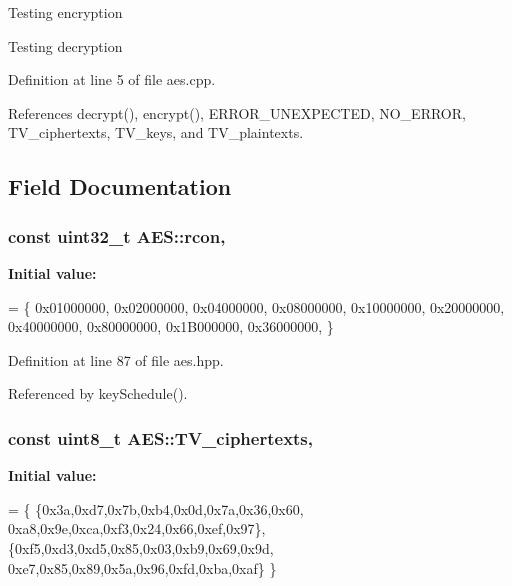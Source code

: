  Testing encryption

Testing decryption 

Definition at line 5 of file aes.\+cpp.



References decrypt(), encrypt(), E\+R\+R\+O\+R\+\_\+\+U\+N\+E\+X\+P\+E\+C\+T\+E\+D, N\+O\+\_\+\+E\+R\+R\+O\+R, T\+V\+\_\+ciphertexts, T\+V\+\_\+keys, and T\+V\+\_\+plaintexts.



\subsection{Field Documentation}
\hypertarget{classAES_a5f6082649a62bd52938c6b3b4c5a526f}{}
\subsubsection[{rcon}]{\setlength{\rightskip}{0pt plus 5cm}const uint32\+\_\+t A\+E\+S\+::rcon\hspace{0.3cm}{\ttfamily [static]}, {\ttfamily [private]}}\label{classAES_a5f6082649a62bd52938c6b3b4c5a526f}
{\bfseries Initial value\+:}
\begin{DoxyCode}
= \{
    0x01000000, 0x02000000, 0x04000000, 0x08000000,
    0x10000000, 0x20000000, 0x40000000, 0x80000000,
    0x1B000000, 0x36000000, 
\}
\end{DoxyCode}


Definition at line 87 of file aes.\+hpp.



Referenced by key\+Schedule().

\hypertarget{classAES_aaa75b4b36597677f162e2752d6c2b407}{}
\subsubsection[{T\+V\+\_\+ciphertexts}]{\setlength{\rightskip}{0pt plus 5cm}const uint8\+\_\+t A\+E\+S\+::\+T\+V\+\_\+ciphertexts\hspace{0.3cm}{\ttfamily [static]}, {\ttfamily [private]}}\label{classAES_aaa75b4b36597677f162e2752d6c2b407}
{\bfseries Initial value\+:}
\begin{DoxyCode}
= \{
  \{0x3a,0xd7,0x7b,0xb4,0x0d,0x7a,0x36,0x60,
   0xa8,0x9e,0xca,0xf3,0x24,0x66,0xef,0x97\},
  \{0xf5,0xd3,0xd5,0x85,0x03,0xb9,0x69,0x9d,
   0xe7,0x85,0x89,0x5a,0x96,0xfd,0xba,0xaf\}
\}
\end{DoxyCode}


